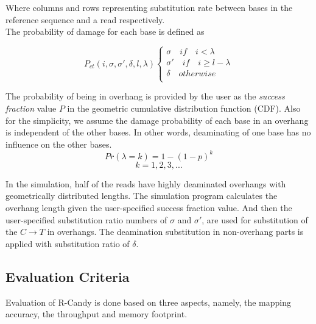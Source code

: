 \documentclass[11pt,a4paper]{report}
\begin{document}
Where columns and rows representing substitution rate between 
bases in the reference sequence and a read respectively.\\
The probability of damage for each base is defined as 

\[ P_{ct}(i, \sigma, \sigma', \delta, l, \lambda ) 
\begin{cases}
    \sigma  \quad if \quad i < \lambda  \\
    \sigma' \quad if \quad i \geq l-\lambda \\
    \delta \quad otherwise  \\
\end{cases}
\]

The probability of being in overhang is provided by the user as the 
\emph{success fraction} value $P$ in the geometric cumulative distribution 
function (CDF). Also for the simplicity, we assume the damage probability 
of each base  in an overhang is independent of the other bases. In other 
words, deaminating of one base has no influence on the other bases.\\

$$Pr( \lambda = k ) = 1 - (1 - p)^{k}$$
$$ k = 1, 2, 3, ... $$

In the simulation, half of the reads have highly deaminated overhangs
with geometrically distributed lengths. The simulation program calculates 
the overhang length given the user-specified success fraction value.
And then the user-specified substitution ratio numbers of $ \sigma $ 
and $\sigma' $,  are used for substitution of the $ C \rightarrow T$ 
in overhangs. The deamination substitution  in non-overhang parts is 
applied with substitution ratio of $\delta$.





\subsection{Evaluation Criteria} \label{Evaluation Criteria}

Evaluation of R-Candy is done based on three aspects, namely, 
the mapping accuracy, the throughput and memory footprint.
\end{document}
